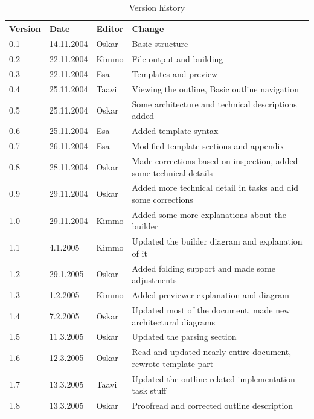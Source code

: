 \documentclass[a4paper,11pt,twoside]{article}
\begin{document}
\begin{table}[!htpb]
\begin{center}
\caption{Version history}
\begin{tabular}{lllp{60mm}}
Version & Date & Editor & Change \\
\midrule
0.1 & 14.11.2004 & Oskar & Basic structure\\
0.2 & 22.11.2004 & Kimmo & File output and building\\
0.3 & 22.11.2004 & Esa & Templates and preview\\ 
0.4 & 25.11.2004 & Taavi & Viewing the outline, Basic outline navigation\\
0.5 & 25.11.2004 & Oskar & Some architecture and technical descriptions added\\
0.6 & 25.11.2004 & Esa & Added template syntax\\
0.7 & 26.11.2004 & Esa & Modified template sections and appendix\\
0.8 & 28.11.2004 & Oskar & Made corrections based on inspection, added some technical details\\
0.9 & 29.11.2004 & Oskar & Added more technical detail in tasks and did some corrections\\
1.0 & 29.11.2004 & Kimmo & Added some more explanations about the builder\\
1.1 &   4.1.2005 & Kimmo & Updated the builder diagram and explanation of it\\
1.2 &  29.1.2005 & Oskar & Added folding support and made some adjustments\\
1.3 &   1.2.2005 & Kimmo & Added previewer explanation and diagram\\
1.4 &   7.2.2005 & Oskar & Updated most of the document, made new architectural diagrams\\
1.5 &  11.3.2005 & Oskar & Updated the parsing section\\
1.6 &  12.3.2005 & Oskar & Read and updated nearly entire document, rewrote template part\\
1.7 &  13.3.2005 & Taavi & Updated the outline related implementation task stuff\\
1.8 &  13.3.2005 & Oskar & Proofread and corrected outline description\\
\end{tabular}
\end{center}
\end{table}


\clearpage
\tableofcontents
\clearpage
\end{document}
